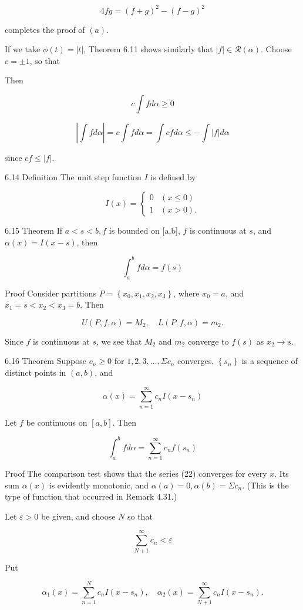 \documentclass[10pt]{article}
\begin{document}
$$
4 f g=(f+g)^{2}-(f-g)^{2}
$$

completes the proof of $(a)$.

If we take $\phi(t)=|t|$, Theorem 6.11 shows similarly that $|f| \in \mathscr{R}(\alpha)$. Choose $c= \pm 1$, so that

Then

$$
c \int f d \alpha \geq 0
$$

$$
\left|\int f d \alpha\right|=c \int f d \alpha=\int c f d \alpha \leq-\int|f| d \alpha
$$

since $c f \leq|f|$.

6.14 Definition The unit step function $I$ is defined by

$$
I(x)= \begin{cases}0 & (x \leq 0) \\ 1 & (x>0) .\end{cases}
$$

6.15 Theorem If $a<s<b, f$ is bounded on [a,b], $f$ is continuous at $s$, and $\alpha(x)=I(x-s)$, then

$$
\int_{a}^{b} f d \alpha=f(s)
$$

Proof Consider partitions $P=\left\{x_{0}, x_{1}, x_{2}, x_{3}\right\}$, where $x_{0}=a$, and $x_{1}=s<x_{2}<x_{3}=b$. Then

$$
U(P, f, \alpha)=M_{2}, \quad L(P, f, \alpha)=m_{2} .
$$

Since $f$ is continuous at $s$, we see that $M_{2}$ and $m_{2}$ converge to $f(s)$ as $x_{2} \rightarrow s$.

6.16 Theorem Suppose $c_{n} \geq 0$ for $1,2,3, \ldots, \Sigma c_{n}$ converges, $\left\{s_{n}\right\}$ is a sequence of distinct points in $(a, b)$, and

$$
\alpha(x)=\sum_{n=1}^{\infty} c_{n} I\left(x-s_{n}\right)
$$

Let $f$ be continuous on $[a, b]$. Then

$$
\int_{a}^{b} f d \alpha=\sum_{n=1}^{\infty} c_{n} f\left(s_{n}\right)
$$

Proof The comparison test shows that the series (22) converges for every $x$. Its sum $\alpha(x)$ is evidently monotonic, and $\alpha(a)=0, \alpha(b)=\Sigma c_{n}$. (This is the type of function that occurred in Remark 4.31.)

Let $\varepsilon>0$ be given, and choose $N$ so that

$$
\sum_{N+1}^{\infty} c_{n}<\varepsilon
$$

Put

$$
\alpha_{1}(x)=\sum_{n=1}^{N} c_{n} I\left(x-s_{n}\right), \quad \alpha_{2}(x)=\sum_{N+1}^{\infty} c_{n} I\left(x-s_{n}\right) .
$$
\end{document}
